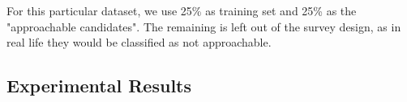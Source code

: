 For this particular dataset, we use 25\% as training set and 25\% as the "approachable candidates". The remaining is left out of the survey design, as in real life they would be classified as not approachable.

\subsection{Experimental Results}








